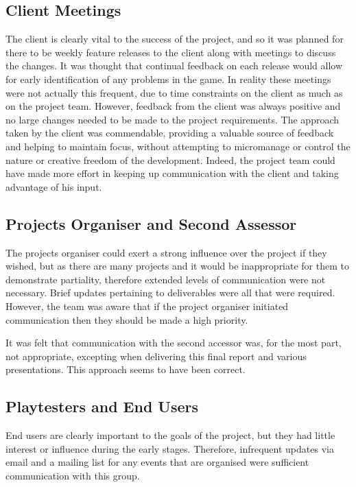 \subsection{Client Meetings}

The client is clearly vital to the success of the project, and so it was planned for there to be weekly feature releases to the client along with meetings to discuss the changes. It was thought that continual
feedback on each release would allow for early identification of any problems in the game.
In reality these meetings were not actually this
frequent, due to time constraints on the client as much as on the project team. However, feedback from the client was always positive and no
large changes needed to be made to the project requirements. 
The approach taken by the client was commendable, providing a valuable source of feedback and helping to maintain focus, without attempting to micromanage or control the nature or creative freedom of the development.
Indeed, the project team could have made more effort in keeping up communication with the client and taking advantage of his input.

\subsection{Projects Organiser and Second Assessor}

The projects organiser could exert a strong influence over the project if they wished,
but as there are many projects and it would be inappropriate for them to demonstrate
partiality, therefore extended levels of communication were not necessary. Brief updates
pertaining to deliverables were all that were required. However, the team was aware that
if the project organiser initiated communication then they should be made a high priority.

It was felt that communication with the second accessor was, for the most part, not
appropriate, excepting when delivering this final report and various presentations. This approach seems to have been correct.

\subsection{Playtesters and End Users}

End users are clearly important to the goals of the project, but they had little
interest or influence during the early stages. Therefore, infrequent updates via email
and a mailing list for any events that are organised were sufficient communication with
this group.

